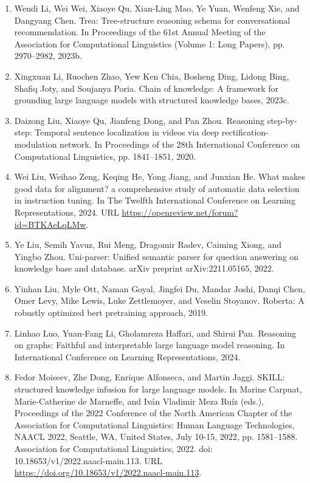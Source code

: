 \documentclass[11pt,UTF8,fontset=fandol]{ctexart}
\begin{document}
\begin{enumerate}[leftmargin=2em]
\item Wendi Li, Wei Wei, Xiaoye Qu, Xian-Ling Mao, Ye Yuan, Wenfeng Xie, and Dangyang Chen. Trea: Tree-structure reasoning schema for conversational recommendation. In Proceedings of the 61st Annual Meeting of the Association for Computational Linguistics (Volume 1: Long Papers), pp. 2970--2982, 2023b.
\item Xingxuan Li, Ruochen Zhao, Yew Ken Chia, Bosheng Ding, Lidong Bing, Shafiq Joty, and Soujanya Poria. Chain of knowledge: A framework for grounding large language models with structured knowledge bases, 2023c.
\item Daizong Liu, Xiaoye Qu, Jianfeng Dong, and Pan Zhou. Reasoning step-by-step: Temporal sentence localization in videos via deep rectification-modulation network. In Proceedings of the 28th International Conference on Computational Linguistics, pp. 1841--1851, 2020.
\item Wei Liu, Weihao Zeng, Keqing He, Yong Jiang, and Junxian He. What makes good data for alignment? a comprehensive study of automatic data selection in instruction tuning. In The Twelfth International Conference on Learning Representations, 2024. URL \url{https://openreview.net/forum?id=BTKAeLqLMw}.
\item Ye Liu, Semih Yavuz, Rui Meng, Dragomir Radev, Caiming Xiong, and Yingbo Zhou. Uni-parser: Unified semantic parser for question answering on knowledge base and database. arXiv preprint arXiv:2211.05165, 2022.
\item Yinhan Liu, Myle Ott, Naman Goyal, Jingfei Du, Mandar Joshi, Danqi Chen, Omer Levy, Mike Lewis, Luke Zettlemoyer, and Veselin Stoyanov. Roberta: A robustly optimized bert pretraining approach, 2019.
\item Linhao Luo, Yuan-Fang Li, Gholamreza Haffari, and Shirui Pan. Reasoning on graphs: Faithful and interpretable large language model reasoning. In International Conference on Learning Representations, 2024.
\item Fedor Moiseev, Zhe Dong, Enrique Alfonseca, and Martin Jaggi. SKILL: structured knowledge infusion for large language models. In Marine Carpuat, Marie-Catherine de Marneffe, and Iv\'{a}n Vladimir Meza Ru\'{i}z (eds.), Proceedings of the 2022 Conference of the North American Chapter of the Association for Computational Linguistics: Human Language Technologies, NAACL 2022, Seattle, WA, United States, July 10-15, 2022, pp. 1581--1588. Association for Computational Linguistics, 2022. doi: 10.18653/v1/2022.naacl-main.113. URL \url{https://doi.org/10.18653/v1/2022.naacl-main.113}.

\end{enumerate}
\end{document}
